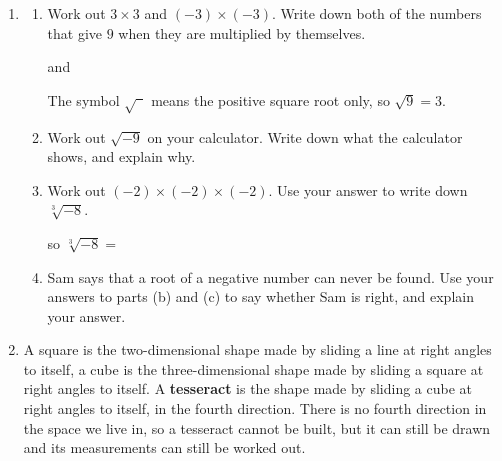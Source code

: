 \documentclass[12pt,a4paper]{article}
\newcommand{\ansline}[1][2.2cm]{\underline{\hspace{#1}}}
\begin{document}
\begin{enumerate}[resume]

\item
\begin{enumerate}
  \item Work out $3\times3$ and $(-3)\times(-3)$. Write down both of the
        numbers that give $9$ when they are multiplied by themselves.

\vspace{8pt}
\ansline[5.5cm] \hspace{1.5em} and \hspace{1.5em} \ansline[5.5cm]

\vspace{6pt}
The symbol $\sqrt{\phantom{a}}$ means the positive square root only, so
$\sqrt{9}=3$.

\vspace{6pt}
  \item Work out $\sqrt{-9}$ on your calculator. Write down what the calculator
        shows, and explain why.

\vspace{6pt}
\ansline[16cm]

\vspace{16pt}
\ansline[16cm]

\vspace{6pt}
  \item Work out $(-2)\times(-2)\times(-2)$. Use your answer to write down
        $\sqrt[3]{-8}$.

\vspace{8pt}
\ansline[5.5cm] \hspace{1.5em} so \hspace{1.5em} $\sqrt[3]{-8}=$ \ansline[3cm]

\vspace{6pt}
  \item Sam says that a root of a negative number can never be found. Use your
        answers to parts (b) and (c) to say whether Sam is right, and explain
        your answer.

\vspace{6pt}
\ansline[16cm]

\vspace{16pt}
\ansline[16cm]

\end{enumerate}

\item A square is the two-dimensional shape made by sliding a line at right
angles to itself, a cube is the three-dimensional shape made by sliding a
square at right angles to itself. A \textbf{tesseract} is the shape made by
sliding a cube at right angles to itself, in the fourth direction. There is no
fourth direction in the space we live in, so a tesseract cannot be built, but
it can still be drawn and its measurements can still be worked out.


\end{enumerate}
\end{document}
